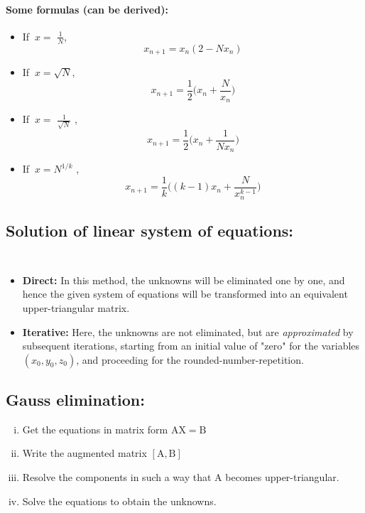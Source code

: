 \documentclass{article}
\begin{document}
{\paragraph{\Large Some formulas (can be derived):}
\begin{itemize}
\item If {\LARGE $\ x=$} {\huge $\frac{1}N$},
{\LARGE $$x_{n+1}=x_n(2-Nx_n)$$}
\item If {\LARGE $\ x=\sqrt{N},$}
{\LARGE $$x_{n+1}=\frac{1}2\bigg(x_n+\frac{N}{x_n}\bigg)$$}
\item If {\LARGE $\ x=$} {\huge $\frac{1}{\sqrt{N}}$} ,
{\LARGE $$x_{n+1}=\frac{1}2\bigg(x_n+\frac{1}{Nx_n}\bigg)$$}
\item If {\LARGE $\ x=N^{1/k}$} ,
{\LARGE $$x_{n+1}=\frac{1}k\bigg((k-1)x_n+\frac{N}{x_n^{k-1}}\bigg)$$}
\end{itemize}
\newpage
\subsection{\LARGE Solution of linear system of equations:}
$\ $
\begin{center}
\end{center}
$\ $
\begin{itemize}
\item \textbf{Direct:} In this method, the unknowns will be eliminated one by one, and hence the given system of equations will be transformed into an equivalent upper-triangular matrix.
\item \textbf{Iterative:} Here, the unknowns are not eliminated, but are \textit{approximated} by subsequent iterations, starting from an initial value of "zero" for the variables $(x_0,y_0,z_0)$, and proceeding for the rounded-number-repetition.
\end{itemize}
\subsection{\LARGE Gauss elimination:}
\begin{enumerate}[(i)]
\item Get the equations in matrix form {\LARGE $\mathrm{AX=B}$}
\item Write the augmented matrix $\mathrm{[A,B]}$
\item Resolve the components in such a way that $\mathrm A$ becomes upper-triangular.
\item Solve the equations to obtain the unknowns.
\end{enumerate}
}
\end{document}
